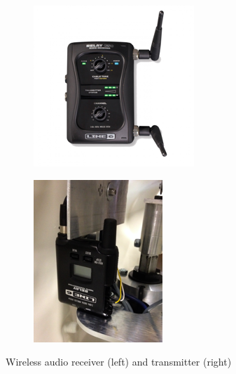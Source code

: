 \begin{figure}[H]
    \centering
    \begin{subfigure}{0.25\linewidth}
        \includegraphics[width=\linewidth]{files/Receiver.png}
    \end{subfigure}
    \begin{subfigure}{0.25\linewidth}
        \includegraphics[width=\linewidth]{files/Transmitter.png}
    \end{subfigure}
    \caption{Wireless audio receiver (left) and transmitter (right)}
    \label{fig:audio}
\end{figure}

